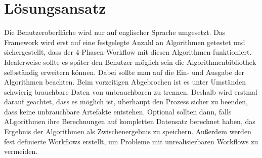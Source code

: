 \section{Lösungsansatz}
Die Benutzeroberfläche wird nur auf englischer Sprache umgesetzt. \newline
Das Framework wird erst auf eine festgelegte Anzahl an Algorithmen getestet und sichergestellt, dass der 4-Phasen-Workflow mit diesen Algorithmen funktioniert. Idealerweise sollte es später den Benutzer möglich sein die Algorithmenbibliothek selbständig erweitern können. Dabei sollte man auf die Ein- und Ausgabe der Algorithmen beachten. \newline
Beim vorzeitigen Abgebrochen ist es unter Umständen schwierig brauchbare Daten von unbrauchbaren zu trennen. Deshalb wird erstmal darauf geachtet, dass es möglich ist, überhaupt den Prozess sicher zu beenden, dass keine unbrauchbare Artefakte entstehen. Optional sollten dann, falls ALgorithmen ihre Berechnungen auf kompletten Datensatz berechnet haben, das Ergebnis der Algorithmen als Zwischenergebnis zu speichern.
\newline Außerdem werden fest definierte Workflows erstellt, um Probleme mit unrealisierbaren Workflows zu vermeiden. 
